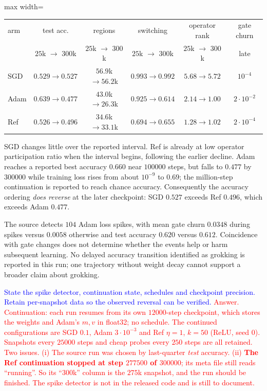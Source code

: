 \documentclass{article}
\newcommand{\zied}[1]{\textcolor{blue}{#1}}
\newcommand{\nat}[1]{\textcolor{red}{#1}}
\theoremstyle{definition}
\theoremstyle{remark}
\begin{document}
\begin{center}\small
\begin{adjustbox}{max width=\linewidth}
\begin{tabular}{lccccc}
\toprule
arm & test acc. & regions & switching & operator rank & gate churn \\
 & $25$k $\to$ $300$k & $25$k $\to$ $300$k & $25$k $\to$ $300$k & $25$k $\to$ $300$k & late \\
\midrule
SGD & $0.529 \to 0.527$ & $56.9$k $\to 56.2$k & $0.993 \to 0.992$ & $5.68 \to 5.72$ & $10^{-4}$ \\
Adam             & $0.639 \to 0.477$ & $43.0$k $\to 26.3$k & $0.925 \to 0.614$ & $2.14 \to 1.00$ & $2\cdot10^{-2}$ \\
Ref        & $0.526 \to 0.496$ & $34.6$k $\to 33.1$k & $0.694 \to 0.655$ & $1.28 \to 1.02$ & $2\cdot10^{-4}$ \\
\bottomrule
\end{tabular}
\end{adjustbox}
\end{center}

SGD changes little over the reported interval. Ref is already at low operator participation ratio when the interval begins, following the earlier decline. Adam reaches a reported best accuracy $0.660$ near $100000$ steps, but falls to $0.477$ by $300000$ while training loss rises from about $10^{-9}$ to $0.69$; the million-step continuation is reported to reach chance accuracy. Consequently the accuracy ordering \emph{does reverse} at the later checkpoint: SGD $0.527$ exceeds Ref $0.496$, which exceeds Adam $0.477$.

The source detects $104$ Adam loss spikes, with mean gate churn $0.0348$ during spikes versus $0.0058$ otherwise and test accuracy $0.620$ versus $0.612$. Coincidence with gate changes does not determine whether the events help or harm subsequent learning. No delayed accuracy transition identified as grokking is reported in this run; one trajectory without weight decay cannot support a broader claim about grokking.

\zied{State the spike detector, continuation state, schedules and checkpoint precision. Retain per-snapshot data so the observed reversal can be verified.}
\nat{Answer. Continuation: each run resumes from its own $12000$-step checkpoint, which stores the weights and Adam's $m,v$ in float32; no schedule. The continued configurations are SGD $0.1$, Adam $3\cdot10^{-3}$ and Ref $\eta=1$, $k=50$ (ReLU, seed $0$). Snapshots every $25000$ steps and cheap probes every $250$ steps are all retained. Two issues. (i) The source run was chosen by last-quarter \emph{test} accuracy. (ii) \textbf{The Ref continuation stopped at step $277500$ of $300000$}; its meta file still reads ``running''. So its ``$300$k'' column is the $275$k snapshot, and the run should be finished. The spike detector is not in the released code and is still to document.}
\end{document}
